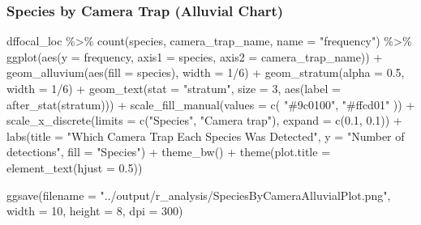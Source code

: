 \documentclass[
  letterpaper,
  DIV=11,
  numbers=noendperiod]{scrartcl}
\newenvironment{Shaded}{\begin{snugshade}}{\end{snugshade}}
\newcommand{\AttributeTok}[1]{\textcolor[rgb]{0.40,0.45,0.13}{#1}}
\newcommand{\DecValTok}[1]{\textcolor[rgb]{0.68,0.00,0.00}{#1}}
\newcommand{\FloatTok}[1]{\textcolor[rgb]{0.68,0.00,0.00}{#1}}
\newcommand{\FunctionTok}[1]{\textcolor[rgb]{0.28,0.35,0.67}{#1}}
\newcommand{\NormalTok}[1]{\textcolor[rgb]{0.00,0.23,0.31}{#1}}
\newcommand{\SpecialCharTok}[1]{\textcolor[rgb]{0.37,0.37,0.37}{#1}}
\newcommand{\StringTok}[1]{\textcolor[rgb]{0.13,0.47,0.30}{#1}}
\begin{document}
\subsubsection{Species by Camera Trap (Alluvial
Chart)}\label{species-by-camera-trap-alluvial-chart}

\begin{Shaded}
\begin{Highlighting}[]
\NormalTok{dffocal\_loc }\SpecialCharTok{\%\textgreater{}\%}
  \FunctionTok{count}\NormalTok{(species, camera\_trap\_name, }\AttributeTok{name =} \StringTok{"frequency"}\NormalTok{) }\SpecialCharTok{\%\textgreater{}\%}
  \FunctionTok{ggplot}\NormalTok{(}\FunctionTok{aes}\NormalTok{(}\AttributeTok{y =}\NormalTok{ frequency, }\AttributeTok{axis1 =}\NormalTok{ species, }\AttributeTok{axis2 =}\NormalTok{ camera\_trap\_name)) }\SpecialCharTok{+}
  \FunctionTok{geom\_alluvium}\NormalTok{(}\FunctionTok{aes}\NormalTok{(}\AttributeTok{fill =}\NormalTok{ species), }\AttributeTok{width =} \DecValTok{1}\SpecialCharTok{/}\DecValTok{6}\NormalTok{) }\SpecialCharTok{+}
  \FunctionTok{geom\_stratum}\NormalTok{(}\AttributeTok{alpha =} \FloatTok{0.5}\NormalTok{, }\AttributeTok{width =} \DecValTok{1}\SpecialCharTok{/}\DecValTok{6}\NormalTok{) }\SpecialCharTok{+}
  \FunctionTok{geom\_text}\NormalTok{(}\AttributeTok{stat =} \StringTok{"stratum"}\NormalTok{, }\AttributeTok{size =} \DecValTok{3}\NormalTok{, }\FunctionTok{aes}\NormalTok{(}\AttributeTok{label =} \FunctionTok{after\_stat}\NormalTok{(stratum))) }\SpecialCharTok{+}
  \FunctionTok{scale\_fill\_manual}\NormalTok{(}\AttributeTok{values =} \FunctionTok{c}\NormalTok{(}
    \StringTok{"\#9c0100"}\NormalTok{,}
    \StringTok{"\#ffcd01"}
\NormalTok{  )) }\SpecialCharTok{+}
  \FunctionTok{scale\_x\_discrete}\NormalTok{(}\AttributeTok{limits =} \FunctionTok{c}\NormalTok{(}\StringTok{"Species"}\NormalTok{, }\StringTok{"Camera trap"}\NormalTok{), }\AttributeTok{expand =} \FunctionTok{c}\NormalTok{(}\FloatTok{0.1}\NormalTok{, }\FloatTok{0.1}\NormalTok{)) }\SpecialCharTok{+}
  \FunctionTok{labs}\NormalTok{(}\AttributeTok{title =} \StringTok{"Which Camera Trap Each Species Was Detected"}\NormalTok{,}
       \AttributeTok{y =} \StringTok{"Number of detections"}\NormalTok{, }\AttributeTok{fill =} \StringTok{"Species"}\NormalTok{) }\SpecialCharTok{+}
  \FunctionTok{theme\_bw}\NormalTok{() }\SpecialCharTok{+}
  \FunctionTok{theme}\NormalTok{(}\AttributeTok{plot.title =} \FunctionTok{element\_text}\NormalTok{(}\AttributeTok{hjust =} \FloatTok{0.5}\NormalTok{))}

\FunctionTok{ggsave}\NormalTok{(}\AttributeTok{filename =} \StringTok{"../output/r\_analysis/SpeciesByCameraAlluvialPlot.png"}\NormalTok{, }\AttributeTok{width =} \DecValTok{10}\NormalTok{, }\AttributeTok{height =} \DecValTok{8}\NormalTok{, }\AttributeTok{dpi =} \DecValTok{300}\NormalTok{)}
\end{Highlighting}
\end{Shaded}
\end{document}
